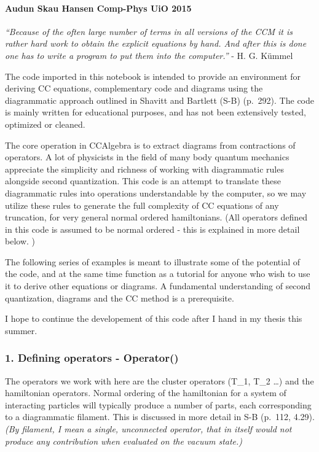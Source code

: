 \documentclass[letterpaper,10pt,english]{/Users/kinealicegulbrandsen/anaconda/lib/python2.7/site-packages/sphinx/texinputs/sphinxhowto}
\begin{document}
\paragraph{Audun Skau Hansen \textbar{} Comp-Phys \textbar{} UiO
\textbar{} 2015}\label{audun-skau-hansen-comp-phys-uio-2015}

\emph{``Because of the often large number of terms in all versions of
the CCM it is rather hard work to obtain the explicit equations by hand.
And after this is done one has to write a program to put them into the
computer.''} - H. G. Kümmel

The code imported in this notebook is intended to provide an environment
for deriving CC equations, complementary code and diagrams using the
diagrammatic approach outlined in Shavitt and Bartlett (S-B) (p.~292).
The code is mainly written for educational purposes, and has not been
extensively tested, optimized or cleaned.

The core operation in CCAlgebra is to extract diagrams from contractions
of operators. A lot of physicists in the field of many body quantum
mechanics appreciate the simplicity and richness of working with
diagrammatic rules alongside second quantization. This code is an
attempt to translate these diagrammatic rules into operations
understandable by the computer, so we may utilize these rules to
generate the full complexity of CC equations of any truncation, for very
general normal ordered hamiltonians. (All operators defined in this code
is assumed to be normal ordered - this is explained in more detail
below. )

The following series of examples is meant to illustrate some of the
potential of the code, and at the same time function as a tutorial for
anyone who wish to use it to derive other equations or diagrams. A
fundamental understanding of second quantization, diagrams and the CC
method is a prerequisite.

I hope to continue the developement of this code after I hand in my
thesis this summer.\subsubsection{1. Defining operators -
Operator()}\label{defining-operators---operator}

The operators we work with here are the cluster operators (T\_1, T\_2
\ldots{}) and the hamiltonian operators. Normal ordering of the
hamiltonian for a system of interacting particles will typically produce
a number of parts, each corresponding to a diagrammatic filament. This
is discussed in more detail in S-B (p.~112, 4.29). \emph{(By filament, I
mean a single, unconnected operator, that in itself would not produce
any contribution when evaluated on the vacuum state.)}
\end{document}
